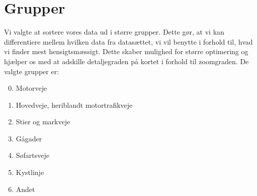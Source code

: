 \section{Grupper}
Vi valgte at sortere vores data ud i større grupper. Dette gør, at vi kan differentiere mellem hvilken data fra datasættet, vi vil benytte i forhold til, hvad vi finder mest hensigtsmæssigt. Dette skaber mulighed for større optimering og hjælper os med at adskille detaljegraden på kortet i forhold til zoomgraden. De valgte grupper er:
\begin{enumerate}
\setcounter{enumi}{-1}
	\item Motorveje
	\item Hovedveje, heriblandt motortrafikveje
	\item Stier og markveje
	\item Gågader
	\item Søfartsveje
	\item Kystlinje
	\item Andet
\end{enumerate}